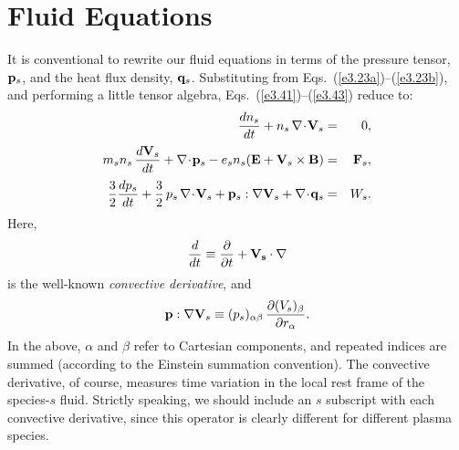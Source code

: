 \section{Fluid Equations}
It is conventional to rewrite our fluid equations in terms of the pressure tensor,
${\bf p}_s$, 
and the heat flux density, ${\bf q}_s$. Substituting from Eqs.~(\ref{e3.23a})--(\ref{e3.23b}), and performing a little
 tensor
algebra,  Eqs.~(\ref{e3.41})--(\ref{e3.43})  reduce to:
\begin{eqnarray}\label{e3.46a}
\frac{dn_s}{dt} + n_s\,\nabla\!\cdot\!{\bf V}_s &=& 0,\\[0.5ex]
m_s n_s\,\frac{d {\bf V}_s}{dt} + \nabla\!\cdot \!{\bf p}_s - e_s n_s
({\bf E} + {\bf V}_s\times {\bf B})& =& {\bf F}_s,\\[0.5ex]
\frac{3}{2}\frac{d p_s}{dt} + \frac{3}{2}\,p_s\,\nabla\!\cdot\!{\bf V}_s
+ {\bf p}_s:\nabla{\bf V}_s + \nabla\!\cdot\!{\bf q}_s &=& W_s.\label{e3.46c}
\end{eqnarray}
Here, 
\begin{equation}
\frac{d}{dt} \equiv \frac{\partial}{\partial t} + {\bf V_s}\cdot \nabla
\end{equation}
is the well-known {\em convective derivative}, and 
\begin{equation}
{\bf p} : \nabla {\bf V}_s \equiv (p_s)_{\alpha\beta} \,\frac{\partial (V_s)_{\beta}}{\partial r_\alpha}.
\end{equation}
In the above, $\alpha$ and $\beta$ refer to Cartesian components, and repeated
indices are summed (according to the Einstein summation convention).
The convective derivative, of course, measures time variation  in
the local rest frame of the species-$s$ fluid.
Strictly
speaking, we should include an $s$ subscript with each convective derivative,
since this operator is clearly different for different plasma species. 

